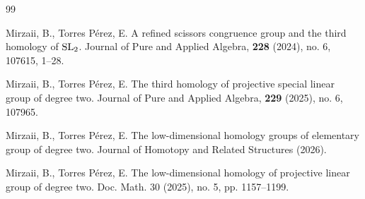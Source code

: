 \documentclass[11pt]{amsart}
\theoremstyle{definition}
\theoremstyle{plain}
\numberwithin{equation}{section}
\newcommand{\z}{\mathbb{Z}}
\newcommand{\SL}{\mathit{{\rm SL}}}
\begin{document}
\begin{thebibliography}{99}






Mirzaii, B., Torres Pérez, E.
A refined scissors congruence group and the third homology of $\SL_2$. Journal of Pure and Applied Algebra, {\bf 228} (2024), no. 6, 107615, 1--28.

Mirzaii, B., Torres Pérez, E.
The third homology of projective special linear group of degree two. Journal of Pure and Applied Algebra, {\bf 229} (2025), no. 6, 107965.

Mirzaii, B., Torres Pérez, E. The low-dimensional homology groups of elementary group of degree two. Journal of Homotopy and Related Structures (2026).

Mirzaii, B., Torres Pérez, E. The low-dimensional homology of projective linear group of degree two. Doc. Math. 30 (2025), no. 5, pp. 1157–1199.




 

\end{thebibliography}
\end{document}
